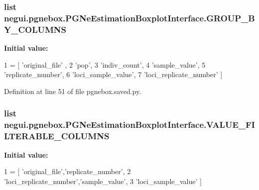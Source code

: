 \subsubsection[{\texorpdfstring{G\+R\+O\+U\+P\+\_\+\+B\+Y\+\_\+\+C\+O\+L\+U\+M\+NS}{GROUP_BY_COLUMNS}}]{\setlength{\rightskip}{0pt plus 5cm}list negui.\+pgnebox.\+P\+G\+Ne\+Estimation\+Boxplot\+Interface.\+G\+R\+O\+U\+P\+\_\+\+B\+Y\+\_\+\+C\+O\+L\+U\+M\+NS\hspace{0.3cm}{\ttfamily [static]}}\hypertarget{classnegui_1_1pgnebox_1_1PGNeEstimationBoxplotInterface_a936532a8e20c08fa76b02620aefcdcb4}{}\label{classnegui_1_1pgnebox_1_1PGNeEstimationBoxplotInterface_a936532a8e20c08fa76b02620aefcdcb4}
{\bfseries Initial value\+:}
\begin{DoxyCode}
1 = [ \textcolor{stringliteral}{'original\_file'} , 
2                         \textcolor{stringliteral}{'pop'}, 
3                         \textcolor{stringliteral}{'indiv\_count'},
4                         \textcolor{stringliteral}{'sample\_value'}, 
5                         \textcolor{stringliteral}{'replicate\_number'}, 
6                         \textcolor{stringliteral}{'loci\_sample\_value'},
7                         \textcolor{stringliteral}{'loci\_replicate\_number'} ]
\end{DoxyCode}


Definition at line 51 of file pgnebox.\+saved.\+py.

\subsubsection[{\texorpdfstring{V\+A\+L\+U\+E\+\_\+\+F\+I\+L\+T\+E\+R\+A\+B\+L\+E\+\_\+\+C\+O\+L\+U\+M\+NS}{VALUE_FILTERABLE_COLUMNS}}]{\setlength{\rightskip}{0pt plus 5cm}list negui.\+pgnebox.\+P\+G\+Ne\+Estimation\+Boxplot\+Interface.\+V\+A\+L\+U\+E\+\_\+\+F\+I\+L\+T\+E\+R\+A\+B\+L\+E\+\_\+\+C\+O\+L\+U\+M\+NS\hspace{0.3cm}{\ttfamily [static]}}\hypertarget{classnegui_1_1pgnebox_1_1PGNeEstimationBoxplotInterface_ac962d7abc19c1dc1c5d3fd0086e0556f}{}\label{classnegui_1_1pgnebox_1_1PGNeEstimationBoxplotInterface_ac962d7abc19c1dc1c5d3fd0086e0556f}
{\bfseries Initial value\+:}
\begin{DoxyCode}
1 = [ \textcolor{stringliteral}{'original\_file'},\textcolor{stringliteral}{'replicate\_number'},
2                                 \textcolor{stringliteral}{'loci\_replicate\_number'},\textcolor{stringliteral}{'sample\_value'}, 
3                                                         \textcolor{stringliteral}{'loci\_sample\_value'} ]
\end{DoxyCode}


